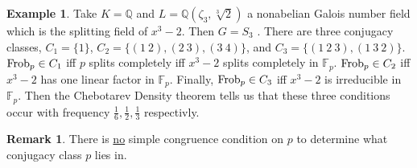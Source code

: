 \documentclass[12pt]{extarticle}
\newcommand{\Q}{\mathbb{Q}}
\theoremstyle{definition}
\newtheorem{remark}[theorem]{Remark}
\newtheorem{example}[theorem]{Example}
\begin{document}
\newcommand{\F}{\mathbb{F}}

\begin{example}
Take $K = \Q$ and $L = \Q(\zeta_3, \sqrt[3]{2})$ a nonabelian Galois number field which is the splitting field of $x^3 - 2$. Then $G = S_3$ . There are three conjugacy classes, $C_1 = \{1\}$, $C_2 = \{ (1 \: 2), (2 \: 3), (3 \: 4) \}$, and $C_3 = \{ (1 \: 2 \: 3), (1 \: 3 \: 2) \}$. $\mathrm{Frob}_p \in C_1$ iff $p$ splits completely iff $x^3 - 2$ splits completely in $\F_p$. $\mathrm{Frob}_p \in C_2$ iff $x^3 - 2$ has one linear factor in $\F_p$. Finally, $\mathrm{Frob}_p \in C_3$ iff $x^3 - 2$ is irreducible in $\F_p$. Then the Chebotarev Density theorem tells us that these three conditions occur with frequency $\frac{1}{6}, \frac{1}{2}, \frac{1}{3}$ respectivly. 
\end{example}

\begin{remark}
There is \underline{no} simple congruence condition on $p$ to determine what conjugacy class $p$ lies in.
\end{remark}
\end{document}
